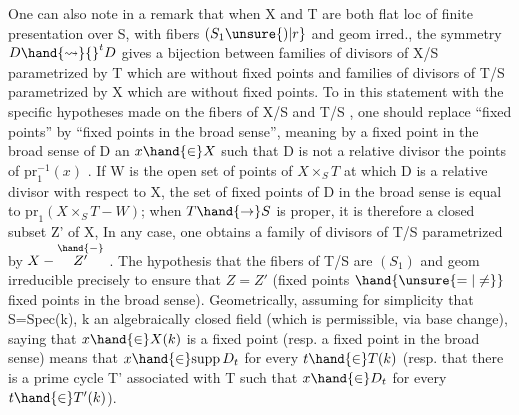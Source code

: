 
One can also note in a remark that when X and T are both
flat loc of finite presentation over S, with fibers $(S_1\unsure{)|r}$ and geom irred.,
the symmetry $D \hand{\rightsquigarrow} {}^{t}D$ gives a bijection between
families of divisors of X/S parametrized by T which are without fixed points
and families of divisors of T/S parametrized by X which are without fixed
points. To  in this statement with the specific hypotheses
made on the fibers of X/S and T/S , one should replace
``fixed points'' by ``fixed points in the broad sense'', meaning by
a fixed point in the broad sense of D an $x \hand{\in} X$ such that D is not a
relative  divisor   the points of $\mathrm{pr}_1^{-1}(x)$ . If W is the open set of
points of $X\times_S T$ at which D is  a relative  divisor with
respect to X, the set of fixed points of D in the broad sense is
 equal to $\mathrm{pr}_1(X\times_S T - W)$; when $T \hand{\to} S$ is proper, it is therefore
a closed subset Z' of X,  In any case, one obtains a
family of divisors of T/S parametrized by $X-\overset{\hand{\relbar}}{Z'}$ . The hypothesis that the
fibers of T/S are $(S_1)$ and geom irreducible   precisely to
ensure that $Z=Z'$ (fixed points $\hand{\unsure{=|\ne}}$ fixed points in the broad sense). Geometrically,
assuming for simplicity that S=Spec(k), k an algebraically closed field
(which is permissible,  via base change), saying that $x \hand{\in} X(k)$
is a fixed point (resp. a fixed point in the broad sense) means that $x \hand{\in} \mathrm{supp}\, D_t$
for every $t \hand{\in} T(k)$ (resp. that there is a prime cycle T' associated with T
such that $x \hand{\in} D_t$ for every $t \hand{\in} T'(k)$).

